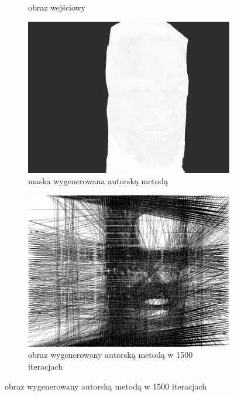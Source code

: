 \documentclass[a4paper, 12pt, polish, twoside]{extreport}
\begin{document}
\begin{figure}[H]
\begin{subfigure}{0.24\textwidth}
        \caption{obraz wejściowy}
        \label{comp-comp-joker-shining-d}
    \end{subfigure}
    \begin{subfigure}{0.24\textwidth}
        \centering
        \includegraphics[width = \textwidth]{img/6-comp/shining_mask_c20_inv0_bg10_obj1_ed1.png}
        \caption{maska wygenerowana autorską metodą}
        \label{comp-comp-joker-shining-e}
    \end{subfigure}
    \begin{subfigure}{0.24\textwidth}
        \centering
        \includegraphics[width = \textwidth]{img/6-comp/shining_r_i1500_c20_inv0_bg10_obj1_ed1.png}
        \caption{obraz wygenerowany autorską metodą w 1500 iteracjach}

\end{subfigure}
\end{figure}
\end{document}
